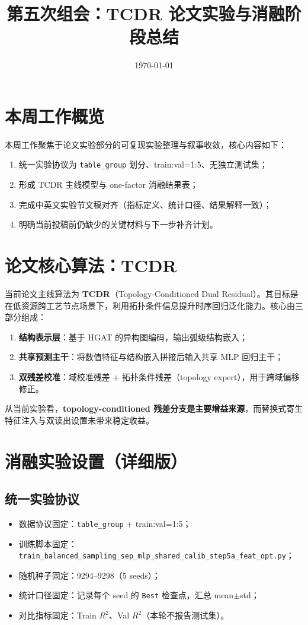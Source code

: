 \documentclass[12pt,a4paper]{ctexart}
\title{第五次组会：TCDR 论文实验与消融阶段总结}
\author{}
\date{\today}
\begin{document}
\maketitle

\section{本周工作概览}
本周工作聚焦于论文实验部分的可复现实验整理与叙事收敛，核心内容如下：
\begin{enumerate}
  \item 统一实验协议为 \texttt{table\_group} 划分、train:val=1:5、无独立测试集；
  \item 形成 TCDR 主线模型与 one-factor 消融结果表；
  \item 完成中英文实验节文稿对齐（指标定义、统计口径、结果解释一致）；
  \item 明确当前投稿前仍缺少的关键材料与下一步补齐计划。
\end{enumerate}

\section{论文核心算法：TCDR}
当前论文主线算法为 \textbf{TCDR}（Topology-Conditioned Dual Residual）。其目标是在低资源跨工艺节点场景下，利用拓扑条件信息提升时序回归泛化能力。核心由三部分组成：
\begin{enumerate}
  \item \textbf{结构表示层}：基于 HGAT 的异构图编码，输出弧级结构嵌入；
  \item \textbf{共享预测主干}：将数值特征与结构嵌入拼接后输入共享 MLP 回归主干；
  \item \textbf{双残差校准}：域校准残差 + 拓扑条件残差（topology expert），用于跨域偏移修正。
\end{enumerate}
从当前实验看，\textbf{topology-conditioned 残差分支是主要增益来源}，而替换式寄生特征注入与双读出设置未带来稳定收益。

\section{消融实验设置（详细版）}
\subsection{统一实验协议}
\begin{itemize}
  \item 数据协议固定：\texttt{table\_group} + train:val=1:5；
  \item 训练脚本固定：\texttt{train\_balanced\_sampling\_sep\_mlp\_shared\_calib\_step5a\_feat\_opt.py}；
  \item 随机种子固定：9294--9298（5 seeds）；
  \item 统计口径固定：记录每个 seed 的 \texttt{Best} 检查点，汇总 mean$\pm$std；
  \item 对比指标固定：Train \(R^2\)、Val \(R^2\)（本轮不报告测试集）。
\end{itemize}
\end{document}
